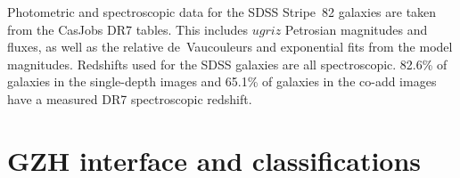 \documentclass[twocolumn]{aastex6}
\begin{document}

Photometric and spectroscopic data for the SDSS Stripe~82 galaxies are taken from the CasJobs DR7 tables. This includes $ugriz$ Petrosian magnitudes and fluxes, as well as the relative de~Vaucouleurs and exponential fits from the model magnitudes. Redshifts used for the SDSS galaxies are all spectroscopic. 82.6\% of galaxies in the single-depth images and 65.1\% of galaxies in the co-add images have a measured DR7 spectroscopic redshift. 

\section{GZH interface and classifications}\label{sec:interface}
\end{document}
